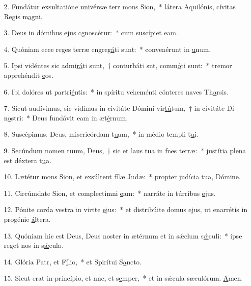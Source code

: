 2. Fundátur exsultatióne univérsæ terr mons S\uline{i}on,~* látera Aquilónis, cívitas Regis m\uline{a}gni.\par 
3. Deus in dómibus ejus cgnosc\uline{é}tur:~* cum suscípiet \uline{e}am.\par 
4. Quóniam ecce reges terræ cngreg\uline{á}ti sunt:~* convenérunt in \uline{u}num.\par 
5. Ipsi vidéntes sic admi\uline{rá}ti sunt,~† conturbáti snt, comm\uline{ó}ti sunt:~* tremor apprehéndit \uline{e}os.\par 
6. Ibi dolóres ut partri\uline{é}ntis:~* in spíritu veheménti cónteres naves Th\uline{a}rsis.\par 
7. Sicut audívimus, sic vídimus in civitáte Dómini vir\uline{tú}tum,~† in civitáte Di n\uline{o}stri:~* Deus fundávit eam in æt\uline{é}rnum.\par 
8. Suscépimus, Deus, misericórdam t\uline{u}am,~* in médio templi t\uline{u}i.\par 
9. Secúndum nomen tuum, \uline{De}us,~† sic et laus tua in fnes t\uline{e}rræ:~* justítia plena est déxtera t\uline{u}a.\par 
10. Lætétur mons Sion, et exsúltent fílæ J\uline{u}dæ:~* propter judícia tua, D\uline{ó}mine.\par 
11. Circúmdate Sion, et complectímni \uline{e}am:~* narráte in túrribus \uline{e}jus.\par 
12. Pónite corda vestra in virtte \uline{e}jus:~* et distribúite domus ejus, ut enarrétis in progénie \uline{á}ltera.\par 
13. Quóniam hic est Deus, Deus noster in ætérnum et in sǽclum s\uline{ǽ}culi:~* ipse reget nos in s\uline{ǽ}cula.\par 
14. Glória Patr, et F\uline{í}lio,~* et Spirítui S\uline{a}ncto.\par 
15. Sicut erat in princípio, et nnc, et s\uline{e}mper,~* et in sǽcula sæculórum. \uline{A}men.\par 
